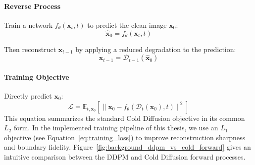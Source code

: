 \paragraph{Reverse Process} Train a network $f_\theta(\mathbf{x}_t, t)$ to predict the clean image $\mathbf{x}_0$:
%
\begin{equation}
\hat{\mathbf{x}}_0 = f_\theta(\mathbf{x}_t, t)
\end{equation}

Then reconstruct $\mathbf{x}_{t-1}$ by applying a reduced degradation to the prediction:
%
\begin{equation}
\mathbf{x}_{t-1} = \mathcal{D}_{t-1}(\hat{\mathbf{x}}_0)
\label{eq:cold_diffusion_reverse}
\end{equation}

\paragraph{Training Objective} Directly predict $\mathbf{x}_0$:
%
\begin{equation}
\mathcal{L} = \mathbb{E}_{t, \mathbf{x}_0}\left[\|\mathbf{x}_0 - f_\theta(\mathcal{D}_t(\mathbf{x}_0), t)\|^2\right]
\label{eq:cold_diffusion_loss}
\end{equation}
This equation summarizes the standard Cold Diffusion objective in its common $L_2$ form. In the implemented training pipeline of this thesis, we use an $L_1$ objective (see Equation~\ref{eq:training_loss}) to improve reconstruction sharpness and boundary fidelity.
Figure~\ref{fig:background_ddpm_vs_cold_forward} gives an intuitive comparison between the DDPM and Cold Diffusion forward processes.

